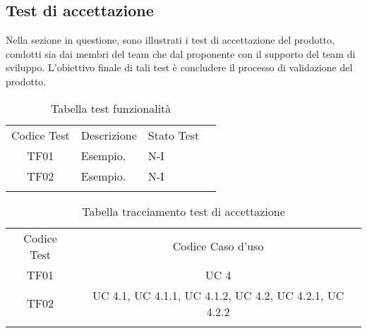 \subsection{Test di accettazione}
Nella sezione in questione, sono illustrati i test di accettazione del prodotto, condotti sia dai membri del team che dal proponente con il supporto del team di sviluppo. L'obiettivo finale di tali test è concludere il processo di validazione del prodotto.
\\
\begin{table}[htbp]
    \centering
    \begin{tabular}{|c|p{3cm}|p{5cm}|c|}
        \hhline{----}
        Codice Test & Descrizione & Stato Test \\
        \hhline{---}
        TF01 & Esempio. & N-I \\
        \hhline{----}
        TF02 & Esempio. & N-I \\
        \hhline{----}
    \end{tabular}
    \caption{Tabella test funzionalità}
    \label{tab:testsAccettazione}
\end{table}

\begin{table}[htbp]
    \centering
    \begin{tabular}{|c|c|}
        \hhline{--}
        Codice Test & Codice Caso d'uso \\
        \hhline{--}
        TF01 & UC 4 \\
        \hhline{--}
        TF02 & UC 4.1, UC 4.1.1, UC 4.1.2, UC 4.2, UC 4.2.1, UC 4.2.2 \\
        \hhline{--}
    \end{tabular}
    \caption{Tabella tracciamento test di accettazione}
    \label{tab:testsTracciamentoAcc}
\end{table}

